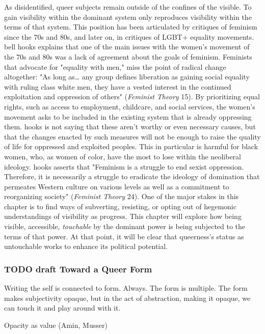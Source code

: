 \documentclass[11pt]{article}
\begin{document}
As disidentified, queer subjects remain outside of the confines of the
visible. To gain visibility within the dominant system only reproduces
visibility within the terms of that system. This position has been
articulated by critiques of feminism since the 70s and 80s, and later
on, in critiques of LGBT+ equality movements. bell hooks explains that
one of the main issues with the women's movement of the 70s and 80s
was a lack of agreement about the goals of feminism. Feminists that
advocate for "equality with men," miss the point of radical change
altogether: "As long as\ldots{} any group defines liberation as gaining
social equality with ruling class white men, they have a vested
interest in the continued exploitation and oppression of others"
(\emph{Feminist Theory} 15). By prioritizing equal rights, such as access
to employment, childcare, and social services, the women's movement
asks to be included in the existing system that is already oppressing
them. hooks is not saying that these aren't worthy or even necessary
causes, but that the changes enacted by such measures will not be
enough to raise the quality of life for oppressed and exploited
peoples. This in particular is harmful for black women, who, as women
of color, have the most to lose within the neoliberal ideology. hooks
asserts that "Feminism is a struggle to end sexist
oppression. Therefore, it is necessarily a struggle to eradicate the
ideology of domination that permeates Western culture on various
levels as well as a commitment to reorganizing society" (\emph{Feminist
Theory} 24). One of the major stakes in this chapter is to find ways
of subverting, resisting, or opting out of hegemonic understandings of
visibility as progress. This chapter will explore how being visible,
accessible, \emph{touchable} by the dominant power is being subjected to
the terms of that power. At that point, it will be clear that
queerness's status as untouchable works to enhance its political
potential.

\subsubsection{{\bfseries\sffamily TODO} draft Toward a Queer Form}
\label{sec:org6e0dc97}
Writing the self is connected to form. Always. The form is
multiple. The form makes subjectivity opaque, but in the act of
abstraction, making it opaque, we can touch it and play around with
it. 

Opacity as value (Amin, Musser)
\end{document}
